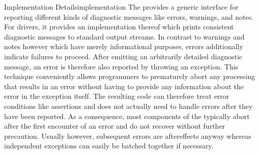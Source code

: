 \begin{presentation}{Implementation Details}{implementation}
The \ecs{} provides a generic interface for reporting different kinds of diagnostic messages like errors, warnings, and notes.
For drivers, it provides an implementation thereof which prints consistent diagnostic messages to standard output streams.
In contrast to warnings and notes however which have merely informational purposes, errors additionally indicate failures to proceed.
After emitting an arbitrarily detailed diagnostic message, an error is therefore also reported by throwing an exception.
This technique conveniently allows programmers to prematurely abort any processing that results in an error without having to provide any information about the error in the exception itself.
The resulting code can therefore treat error conditions like assertions and does not actually need to handle errors after they have been reported.
As a consequence, most components of the \ecs{} typically abort after the first encounter of an error and do not recover without further precaution.
Usually however, subsequent errors are aftereffects anyway whereas independent exceptions can easily be batched together if necessary.


\end{presentation}

\concludechapter
